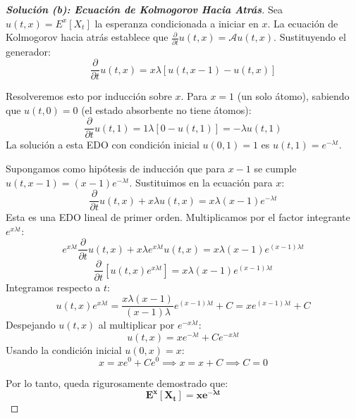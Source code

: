 \documentclass[10pt,a4paper]{article}
\begin{document}
\vspace{5mm}

\begin{proof}[\textbf{Solución (b): Ecuación de Kolmogorov Hacia Atrás}]
    Sea $u(t, x) = E^x[X_t]$ la esperanza condicionada a iniciar en $x$. La ecuación de Kolmogorov hacia atrás establece que $\frac{\partial}{\partial t} u(t,x) = \mathcal{A} u(t,x)$.
    Sustituyendo el generador:
    \[ \frac{\partial}{\partial t} u(t,x) = x\lambda [u(t, x-1) - u(t, x)] \]
    
    Resolveremos esto por inducción sobre $x$.
    Para $x=1$ (un solo átomo), sabiendo que $u(t, 0) = 0$ (el estado absorbente no tiene átomos):
    \[ \frac{\partial}{\partial t} u(t,1) = 1\lambda [0 - u(t, 1)] = -\lambda u(t,1) \]
    La solución a esta EDO con condición inicial $u(0,1) = 1$ es $u(t,1) = e^{-\lambda t}$.
    
    Supongamos como hipótesis de inducción que para $x-1$ se cumple $u(t, x-1) = (x-1)e^{-\lambda t}$. Sustituimos en la ecuación para $x$:
    \[ \frac{\partial}{\partial t} u(t,x) + x\lambda u(t, x) = x\lambda (x-1) e^{-\lambda t} \]
    Esta es una EDO lineal de primer orden. Multiplicamos por el factor integrante $e^{x\lambda t}$:
    \[ e^{x\lambda t} \frac{\partial}{\partial t} u(t,x) + x\lambda e^{x\lambda t} u(t, x) = x\lambda (x-1) e^{(x-1)\lambda t} \]
    \[ \frac{\partial}{\partial t} \left[ u(t,x) e^{x\lambda t} \right] = x\lambda (x-1) e^{(x-1)\lambda t} \]
    Integramos respecto a $t$:
    \[ u(t,x) e^{x\lambda t} = \frac{x\lambda (x-1)}{(x-1)\lambda} e^{(x-1)\lambda t} + C = x e^{(x-1)\lambda t} + C \]
    Despejando $u(t,x)$ al multiplicar por $e^{-x\lambda t}$:
    \[ u(t,x) = x e^{-\lambda t} + C e^{-x\lambda t} \]
    Usando la condición inicial $u(0,x) = x$:
    \[ x = x e^0 + C e^0 \implies x = x + C \implies C = 0 \]
    
    Por lo tanto, queda rigurosamente demostrado que:
    \[ \mathbf{E^x[X_t] = x e^{-\lambda t}} \]
\end{proof}

\vspace{5mm}
\end{document}
